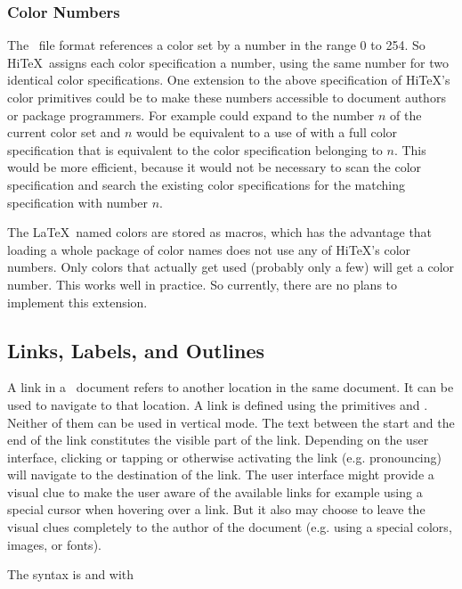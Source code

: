\subsubsection{Color Numbers}
The \HINT\ file format references a color set by a number in the range
0 to 254.
So Hi\TeX\ assigns each color specification a number, using the same
number for two identical color specifications.
One extension to the above specification of Hi\TeX's color primitives
could be to make these numbers accessible to document authors or
package programmers. For example  could
expand to the number $n$ of the current color set and
$n$ would be equivalent to a use of 
with a full color specification that is equivalent to the color specification
belonging to $n$.
This would be more efficient, because it would not be necessary
to scan the color specification and search the existing color specifications
for the matching specification with number $n$.

The \LaTeX\ named colors are stored as macros, which has the advantage that
loading a whole package of color names does not use any of Hi\TeX's
color numbers. Only colors that actually get used (probably only a few)
will get a color number. This works well in practice.
So currently, there are no plans to implement this extension.

\subsection{Links, Labels, and Outlines}\label{llo}
A link in a \HINT\ document refers to another location in the same document.
It can be used to navigate to that location.
A link is defined using the primitives 
and .
Neither of them can be used in vertical mode.
The text between the start and the end of the link
constitutes the visible part of the link. Depending on the user interface, clicking
or tapping or otherwise activating the link (e.g. pronouncing)
will navigate to the destination of the link.
The user interface might provide a visual clue to make the user aware of the
available links for example using a special cursor when hovering over a link.
But it also may choose to leave the visual clues completely to the author
of the document (e.g. using a special colors, images, or fonts).

The syntax is 
  
and
with


